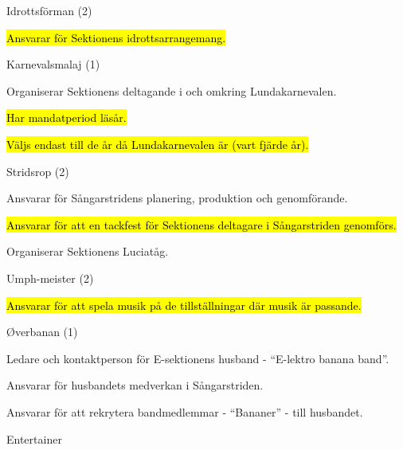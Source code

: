 \documentclass[../_main/handlingar.tex]{subfiles}
\begin{document}
\begin{attsatser}
        Idrottsförman (2)
          \begin{tightdashlist}
              \item \hl{Ansvarar för Sektionens idrottsarrangemang.}
          \end{tightdashlist}

        Karnevalsmalaj (1)
          \begin{tightdashlist}
              \item Organiserar Sektionens deltagande i och omkring Lundakarnevalen.
              \item \hl{Har mandatperiod läsår.}
              \item \hl{Väljs endast till de år då Lundakarnevalen är (vart fjärde år).}
          \end{tightdashlist}

        Stridsrop (2)
          \begin{tightdashlist}
              \item Ansvarar för Sångarstridens planering, produktion och genomförande.
              \item \hl{Ansvarar för att en tackfest för Sektionens deltagare i Sångarstriden genomförs.}
              \item Organiserar Sektionens Luciatåg.
          \end{tightdashlist}

        Umph-meister (2)
        \begin{tightdashlist}
            \item \hl{Ansvarar för att spela musik på de tillställningar där musik är passande.}
        \end{tightdashlist}

        Øverbanan (1)
        \begin{tightdashlist}
            \item Ledare och kontaktperson för E-sektionens husband - “E-lektro banana band”.
            \item Ansvarar för husbandets medverkan i Sångarstriden.
            \item Ansvarar för att rekrytera bandmedlemmar - “Bananer” - till husbandet.
        \end{tightdashlist}

\end{attsatser}
\begin{signatures}{1}
    \ist
    \signature{Albin Nyström Eklund}{Entertainer}
\end{signatures}
\end{document}
